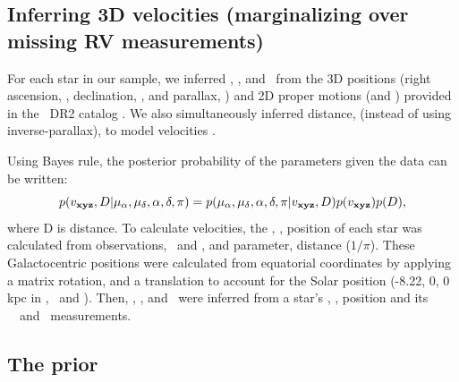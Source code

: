 \subsection{Inferring 3D velocities (marginalizing over missing RV
measurements)}
\label{sec:inference}

For each star in our sample, we inferred \vx, \vy, and \vz\ from the 3D
positions (right ascension, \ra, declination, \dec, and parallax, \parallax)
and 2D proper motions (\mura and \mudec) provided in the \gaia\ DR2 catalog
\citep{brown2011}.
We also simultaneously inferred distance, (instead of using inverse-parallax),
to model velocities \citep[see \eg][]{bailer-jones2015, bailer-jones2018}.

Using Bayes rule, the posterior probability of the parameters given the data
can be written:
\begin{equation}
p(v_{\bf xyz}, D | \mu_{\alpha}, \mu_{\delta}, \alpha, \delta, \pi) =
    p(\mu_{\alpha}, \mu_{\delta}, \alpha, \delta, \pi | v_{\bf xyz}, D)
    p(v_{\bf xyz}) p(D),
\end{equation}
where D is distance.
To calculate velocities, the \x, \y, \z position of each star
was calculated from observations, \ra\ and \dec, and parameter, distance
($1/\pi$).
These Galactocentric positions were calculated from equatorial coordinates by
applying a matrix rotation, and a translation to account for the Solar
position (-8.22, 0, 0 kpc in \x, \y\ and \z).
Then, \vx, \vy, and \vz\ were inferred from a star's \x, \y, \z position and
its \gaia\ \pmra\ and \pmdec\ measurements.

\subsection{The prior}
\label{sec:prior}

